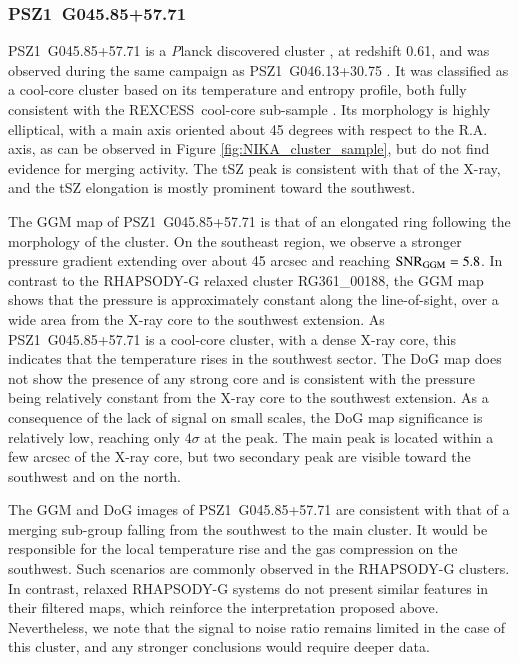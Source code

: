 \documentclass[twocolumn,traditabstract]{aa}
\newcommand{\rexcess}{{\gwpfont REXCESS}}
\begin{document}
\subsubsection{PSZ1~G045.85+57.71}
\mbox{PSZ1~G045.85+57.71} is a {\textit Planck} discovered cluster \citep{PlanckXXIX2014}, at redshift 0.61, and was observed during the same campaign as \mbox{PSZ1~G046.13+30.75} \citep[see][for more details]{Ruppin2016}. It was classified as a cool-core cluster based on its temperature and entropy profile, both fully consistent with the \rexcess\ cool-core sub-sample \citep{Bohringer2007,Arnaud2010,Pratt2010}. Its morphology is highly elliptical, with a main axis oriented about 45 degrees with respect to the R.A. axis, as can be observed in Figure \ref{fig:NIKA_cluster_sample}, but \cite{Ruppin2016} do not find evidence for merging activity. The tSZ peak is consistent with that of the X-ray, and the tSZ elongation is mostly prominent toward the southwest.

The GGM map of \mbox{PSZ1~G045.85+57.71} is that of an elongated ring following the morphology of the cluster. On the southeast region, we observe a stronger pressure gradient extending over about 45 arcsec and reaching ${\rm SNR}_{\rm GGM} = 5.8$. In contrast to the RHAPSODY-G relaxed cluster RG361\_00188, the GGM map shows that the pressure is approximately constant along the line-of-sight, over a wide area from the X-ray core to the southwest extension. As \mbox{PSZ1~G045.85+57.71} is a cool-core cluster, with a dense X-ray core, this indicates that the temperature rises in the southwest sector. The DoG map does not show the presence of any strong core and is consistent with the pressure being relatively constant from the X-ray core to the southwest extension. As a consequence of the lack of signal on small scales, the DoG map significance is relatively low, reaching only $4 \sigma$ at the peak. The main peak is located within a few arcsec of the X-ray core, but two secondary peak are visible toward the southwest and on the north.

The GGM and DoG images of \mbox{PSZ1~G045.85+57.71} are consistent with that of a merging sub-group falling from the southwest to the main cluster. It would be responsible for the local temperature rise and the gas compression on the southwest. Such scenarios are commonly observed in the RHAPSODY-G clusters. In contrast, relaxed RHAPSODY-G systems do not present similar features in their filtered maps, which reinforce the interpretation proposed above. Nevertheless, we note that the signal to noise ratio remains limited in the case of this cluster, and any stronger conclusions would require deeper data.
\end{document}
